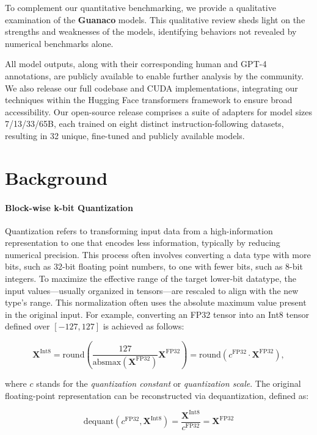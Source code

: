 To complement our quantitative benchmarking, we provide a qualitative examination of the \textbf{Guanaco} models. This qualitative review sheds light on the strengths and weaknesses of the models, identifying behaviors not revealed by numerical benchmarks alone.

All model outputs, along with their corresponding human and GPT-4 annotations, are publicly available to enable further analysis by the community. We also release our full codebase and CUDA implementations, integrating our techniques within the Hugging Face transformers framework \citep{wolf2019huggingface} to ensure broad accessibility. Our open-source release comprises a suite of adapters for model sizes 7/13/33/65B, each trained on eight distinct instruction-following datasets, resulting in 32 unique, fine-tuned and publicly available models.

\section{Background}
\paragraph{Block-wise k-bit Quantization} Quantization refers to transforming input data from a high-information representation to one that encodes less information, typically by reducing numerical precision. This process often involves converting a data type with more bits, such as 32-bit floating point numbers, to one with fewer bits, such as 8-bit integers. To maximize the effective range of the target lower-bit datatype, the input values—usually organized in tensors—are rescaled to align with the new type’s range. This normalization often uses the absolute maximum value present in the original input. For example, converting an FP32 tensor into an Int8 tensor defined over $[-127, 127]$ is achieved as follows:

\begin{equation}
    \mathbf{X}^{ \text{Int8}} = \text{round}\left( \frac{127}{{\text{absmax}}(\mathbf{X}^{{\text{FP32}}})}\mathbf{X}^{{\text{FP32}}} \right) = \text{round}(c^{\text{FP32}}\cdot \mathbf{X}^{{\text{FP32}}}),
\end{equation}

where $c$ stands for the {\em quantization constant} or {\em quantization scale}. The original floating-point representation can be reconstructed via dequantization, defined as:

\begin{equation}
    \text{dequant}(c^{\text{FP32}}, \mathbf{X}^{\text{Int8}}) = \frac{\mathbf{X}^{\text{Int8}}}{c^{\text{FP32}}} = \mathbf{X}^{\text{FP32}}
\end{equation}

